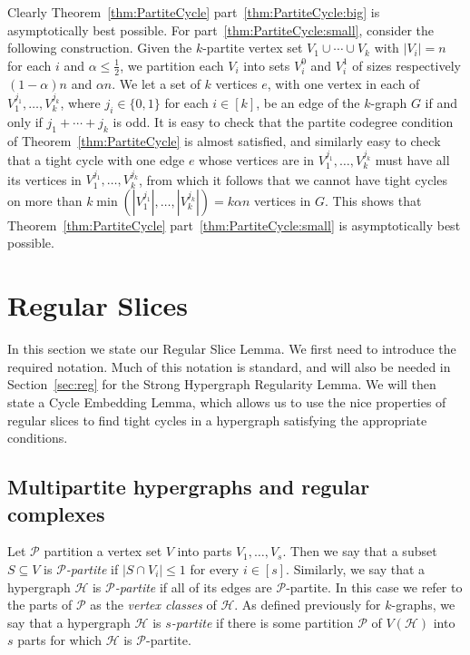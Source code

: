 \documentclass[12pt,a4paper]{amsart}
\newcommand{\Hy}{\mathcal{H}}
\newcommand{\Part}{\mathcal{P}}
\begin{document}
Clearly Theorem~\ref{thm:PartiteCycle} part~\ref{thm:PartiteCycle:big} is asymptotically best possible. For part~\ref{thm:PartiteCycle:small}, consider the following construction. Given the $k$-partite
vertex set $V_1\cup\cdots\cup V_k$
with $|V_i|=n$ for each $i$ and $\alpha\le\frac{1}{2}$, we partition each $V_i$
into sets $V_i^0$ and $V_i^1$ of sizes respectively $(1-\alpha)n$ and $\alpha n$. We let a set of $k$ vertices $e$, with one vertex in each of
$V_1^{j_1},\ldots,V_k^{j_k}$, where $j_i\in\{0,1\}$ for each $i\in[k]$, be an edge of the $k$-graph $G$ if and only if
$j_1+\cdots+j_k$ is odd. It is easy to check that the partite codegree
condition of Theorem~\ref{thm:PartiteCycle} is almost satisfied, and similarly easy to check that a tight cycle
with one edge $e$ whose vertices are in $V_1^{j_1},\ldots,V_k^{j_k}$ must have
all its vertices in $V_1^{j_1},\ldots,V_k^{j_k}$, from which it follows that we
cannot have tight cycles on more than
$k\min(|V_1^{j_1}|,\ldots,|V_k^{j_k}|)=k\alpha n$ vertices in $G$. This shows
that Theorem~\ref{thm:PartiteCycle} part~\ref{thm:PartiteCycle:small} is
asymptotically best possible.

\section{Regular Slices} \label{sec:slice} In this section we state our Regular Slice Lemma. We first need to introduce the required notation.
Much of this notation is standard, and will also be needed in Section~\ref{sec:reg} for the Strong Hypergraph Regularity Lemma. We will then state a Cycle Embedding Lemma, which allows us to use the nice properties of regular slices to find tight cycles in a hypergraph satisfying the appropriate conditions.

\subsection{Multipartite hypergraphs and regular complexes}\label{subsec:regdef}

Let $\Part$ partition a vertex set $V$ into parts $V_1, \dots, V_s$. Then we say
that a subset $S \subseteq V$ is \emph{$\Part$-partite} if $|S \cap V_i| \leq 1$ for
every $i \in [s]$. Similarly, we say that a hypergraph $\Hy$ is \emph{$\Part$-partite} if
all of its edges are $\Part$-partite. In this case we refer to the parts of
$\Part$ as the \emph{vertex classes} of $\Hy$. As defined previously for $k$-graphs, we say that 
a hypergraph $\Hy$ is \emph{$s$-partite} if there is some partition $\Part$ of $V(\Hy)$ into $s$ parts for which $\Hy$ is $\Part$-partite. 
\end{document}
